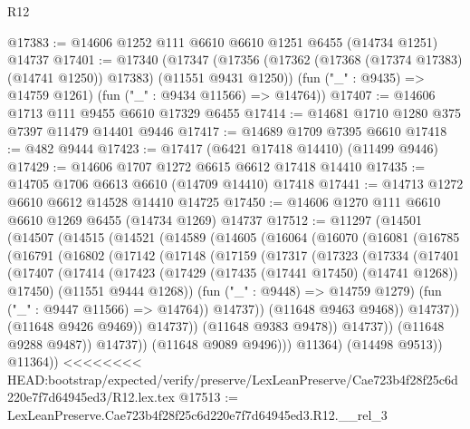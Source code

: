 \begin{lexlean}{R12}
\begin{coremodule}
{{{{{{{{{{{{{{{{{{{{{{{{{{{{{{{{{{{{{{{{{{{{{{{{{{{{{{{{{{{{{{{{{{{{{{{{{{{{{{{{{{@17383 := @14606 @1252 @111 @6610 @6610 @1251 @6455 (@14734 @1251) @14737
@17401 := @17340
    (@17347
      (@17356 (@17362 (@17368 (@17374 @17383) (@14741 @1250)) @17383) (@11551 @9431 @1250))
      (fun ("_" : @9435) => @14759 @1261)
      (fun ("_" : @9434 @11566) => @14764))
@17407 := @14606 @1713 @111 @9455 @6610 @17329 @6455
@17414 := @14681 @1710 @1280 @375 @7397 @11479 @14401 @9446
@17417 := @14689 @1709 @7395 @6610
@17418 := @482 @9444
@17423 := @17417 (@6421 @17418 @14410) (@11499 @9446)
@17429 := @14606 @1707 @1272 @6615 @6612 @17418 @14410
@17435 := @14705 @1706 @6613 @6610 (@14709 @14410) @17418
@17441 := @14713 @1272 @6610 @6612 @14528 @14410 @14725
@17450 := @14606 @1270 @111 @6610 @6610 @1269 @6455 (@14734 @1269) @14737
@17512 := @11297
    (@14501
      (@14507
        (@14515
          (@14521
            (@14589
              (@14605
                (@16064
                  (@16070
                    (@16081
                      (@16785
                        (@16791
                          (@16802
                            (@17142
                              (@17148
                                (@17159
                                  (@17317
                                    (@17323
                                      (@17334
                                        (@17401
                                          (@17407
                                            (@17414
                                              (@17423
                                                (@17429
                                                  (@17435 (@17441 @17450) (@14741 @1268))
                                                  @17450)
                                                (@11551 @9444 @1268))
                                              (fun ("_" : @9448) => @14759 @1279)
                                              (fun ("_" : @9447 @11566) => @14764))
                                            @14737))
                                        (@11648 @9463 @9468))
                                      @14737))
                                  (@11648 @9426 @9469))
                                @14737))
                            (@11648 @9383 @9478))
                          @14737))
                      (@11648 @9288 @9487))
                    @14737))
                (@11648 @9089 @9496)))
            @11364)
          (@14498 @9513))
        @11364))
<<<<<<<< HEAD:bootstrap/expected/verify/preserve/LexLeanPreserve/Cae723b4f28f25c6d220e7f7d64945ed3/R12.lex.tex
@17513 := LexLeanPreserve.Cae723b4f28f25c6d220e7f7d64945ed3.R12.__rel_3
}}}}}}}}}}}}}}}}}}}}}}}}}}}}}}}}}}}}}}}}}}}}}}}}}}}}}}}}}}}}}}}}}}}}}}}}}}}}}}}}}}
\end{coremodule}
\end{lexlean}
